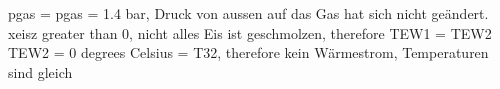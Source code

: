 pgas = pgas = 1.4 bar, Druck von aussen auf das Gas hat sich nicht geändert.  
xeisz greater than 0, nicht alles Eis ist geschmolzen, therefore TEW1 = TEW2  
TEW2 = 0 degrees Celsius = T32, therefore kein Wärmestrom, Temperaturen sind gleich